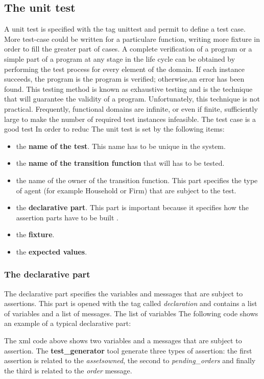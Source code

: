 \documentclass[a4paper,10pt]{article}
\begin{document}
\subsection{The unit test}
A unit test is specified with the tag unittest and permit to define a test case. More test-case could be written for a particulare function, writing  more fixture in order to fill the greater part of cases. A complete verification of a program or a simple part of a program at any stage in the life cycle can be obtained
by performing the test process for every element of the domain. If each instance succeeds, the program is the program is verified; otherwise,an error has been found. This testing method is known as exhaustive testing and
is the technique that will guarantee the validity of a program.
Unfortunately, this technique is not practical. Frequently, functional domains are infinite, or even if finite, sufficiently large to make the number of required test instances infeasible. The test case is a good test 
In order to reduc
The  unit test is set by the following items:
\begin{itemize}
\item the \textbf{name of the test}. This name has to be unique in the  system.
\item the \textbf{name of the transition function} that will has to be tested.
\item the name of the owner of the transition function. This part specifies the type of agent (for example Household or Firm) that are subject to the test.
\item the \textbf{declarative part}. This part is important because it specifies how the assertion parts have to be built .
\item the \textbf{fixture}. 
\item the \textbf{expected values}.
\end{itemize}
\subsubsection{The declarative part}
The declarative part specifies the variables and messages that are subject to assertions. This part is opened with the tag called \textit{declaration} and contains a list of variables and a list of messages. The list of variables 
The following code shows an example of a typical declarative part:

The xml code above shows two variables and a messages that are subject to assertion. The \textbf{test\_generator} tool generate three types of assertion: the first assertion is related to the \textit{assetsowned}, the second to \textit{pending\_orders } and finally the third is related to the \textit{order }message.
\end{document}
